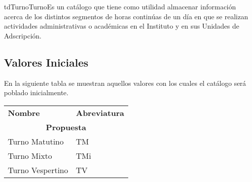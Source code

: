 	\begin{TipoDeDato}{tdTurno}{Turno}{Es un catálogo que tiene como utilidad almacenar información acerca de los distintos segmentos de horas continúas de un día  en que se realizan actividades administrativas o académicas en el Instituto y en sus Unidades de Adscripción.}
	\begin{tdAtributos}
			
	\end{tdAtributos}
	
	
	\subsection{Valores Iniciales}
	 En la siguiente tabla se muestran aquellos valores con los cuales el catálogo será poblado inicialmente.\cdtEmpty
		
		\begin{longtable}{| p{}| p{}|}
	 			\rowcolor{colorPrincipal}
	 			\multicolumn{2}{|c|}{\bf \color{white} Valores Iniciales}\\
	 			\hline
	 			\rowcolor{colorSecundario}
	 			\bf \color{white} Nombre & \bf \color{white} Abreviatura \\
	 			\hline
	 			\multicolumn{2}{|c|}{\bf \color{colorPrincipal}Propuesta}\\
	 			\hline
	 			Turno Matutino & TM\\
	 			\hline
	 			Turno Mixto & TMi \\
	 			\hline
	 			Turno Vespertino & TV \\
	 			\hline
	 		\end{longtable}
	\end{TipoDeDato}
	
